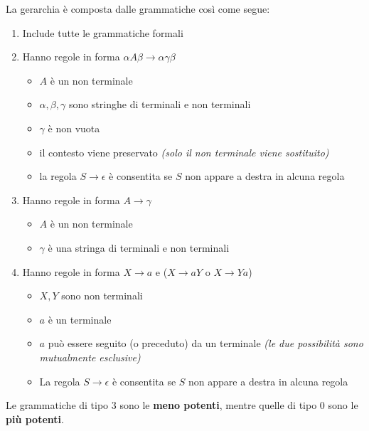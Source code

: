\documentclass[italian, 10pt]{article}
\begin{document}
\begin{minipage}{0.95\textwidth}
  La gerarchia è composta dalle grammatiche così come segue:

  \bigskip
  \begin{enumerate}[start=0, label=Tipo \arabic*:]
    \item Include tutte le grammatiche formali
    \item Hanno regole in forma \(\alpha A \beta \rightarrow \alpha\gamma\beta\)
          \begin{itemize}
            \item \(A\) è un non terminale
            \item \(\alpha, \beta, \gamma\) sono stringhe di terminali e non terminali
            \item \(\gamma\) è non vuota
            \item il contesto viene preservato \textit{(solo il non terminale viene sostituito)}
            \item la regola \(S \rightarrow \epsilon\) è consentita se \(S\) non appare a destra in alcuna regola
          \end{itemize}
    \item Hanno regole in forma \(A \rightarrow \gamma\)
          \begin{itemize}
            \item \(A\) è un non terminale
            \item \(\gamma\) è una stringa di terminali e non terminali
          \end{itemize}
    \item Hanno regole in forma \(X \rightarrow a\) e (\(X \rightarrow aY\) o \(X \rightarrow Ya\))
          \begin{itemize}
            \item \(X, Y\) sono non terminali
            \item \(a\) è un terminale
            \item \(a\) può essere seguito (o preceduto) da un terminale \textit{(le due possibilità sono mutualmente esclusive)}
            \item La regola \(S \rightarrow \epsilon\) è consentita se \(S\) non appare a destra in alcuna regola
          \end{itemize}
  \end{enumerate}
  \bigskip
\end{minipage}

Le grammatiche di tipo \(3\) sono le \textbf{meno potenti}, mentre quelle di tipo \(0\) sono le \textbf{più potenti}.
\end{document}
